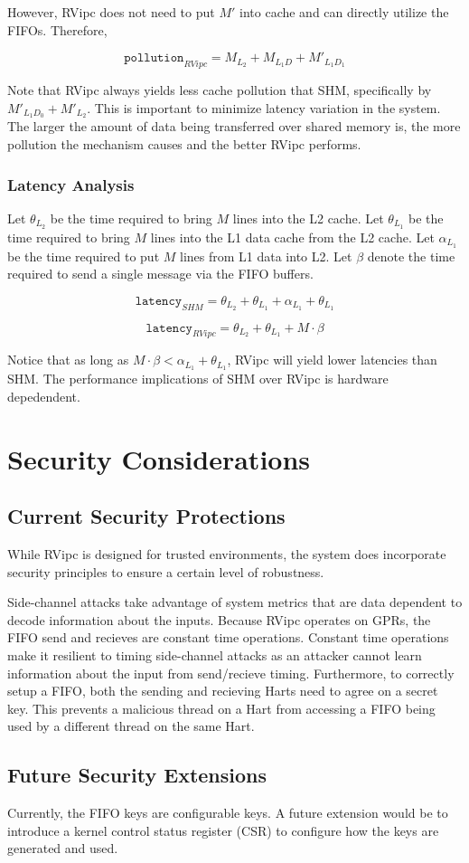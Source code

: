 However, RVipc does not need to put $M'$ into cache and can directly utilize the FIFOs. Therefore, 

\begin{equation}
  \texttt{pollution}_{RVipc} = M_{L_2} + M_{L_1D} + M'_{L_1D_1}
\end{equation}

Note that RVipc always yields less cache pollution that SHM, specifically by $M'_{L_1D_0} + M'_{L_2}$. This is important to minimize latency variation in the system. The larger the amount of data being transferred over shared memory is, the more pollution the mechanism causes and the better RVipc performs.

\subsubsection{Latency Analysis}
Let $\theta_{L_2}$ be the time required to bring $M$ lines into the L2 cache. Let $\theta_{L_1}$ be the time required to bring $M$ lines into the L1 data cache from the L2 cache. Let $\alpha_{L_1}$ be the time required to put $M$ lines from L1 data into L2. Let $\beta$ denote the time required to send a single message via the FIFO buffers.

\begin{equation}
  \texttt{latency}_{SHM} = \theta_{L_2} + \theta_{L_1} + \alpha_{L_1} + \theta_{L_1}
\end{equation}

\begin{equation}
  \texttt{latency}_{RVipc} = \theta_{L_2} + \theta_{L_1} + M \cdot \beta
\end{equation}

Notice that as long as $M \cdot \beta < \alpha_{L_1} + \theta_{L_1}$, RVipc will yield lower latencies than SHM. The performance implications of SHM over RVipc is hardware depedendent.

\section{Security Considerations}
\subsection{Current Security Protections}
While RVipc is designed for trusted environments, the system does incorporate security principles to ensure a certain level of robustness.

Side-channel attacks take advantage of system metrics that are data dependent to decode information about the inputs. Because RVipc operates on GPRs, the FIFO send and recieves are constant time operations. Constant time operations make it resilient to timing side-channel attacks as an attacker cannot learn information about the input from send/recieve timing. Furthermore, to correctly setup a FIFO, both the sending and recieving Harts need to agree on a secret key. This prevents a malicious thread on a Hart from accessing a FIFO being used by a different thread on the same Hart.

\subsection{Future Security Extensions}
Currently, the FIFO keys are configurable keys. A future extension would be to introduce a kernel control status register (CSR) to configure how the keys are generated and used.